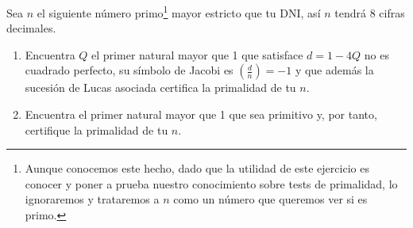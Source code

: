 	Sea $n$ el siguiente número primo\footnote{Aunque conocemos este hecho, dado que la utilidad de este ejercicio
	es conocer y poner a prueba nuestro conocimiento sobre tests de primalidad, lo ignoraremos y trataremos a $n$
	como un número que queremos ver si es primo.} mayor estricto que tu DNI, así $n$ tendrá 8 cifras decimales.

	\begin{enumerate}
		\item Encuentra $Q$ el primer natural mayor que 1 que satisface $d=1-4Q$ no es cuadrado perfecto, su símbolo de
		Jacobi es $\displaystyle \left(\frac{d}{n}\right) = -1$ y que además la sucesión de Lucas asociada certifica
		la primalidad de tu $n$.
		\item Encuentra el primer natural mayor que 1 que sea primitivo y, por tanto, certifique la primalidad de tu $n$.
	\end{enumerate}

